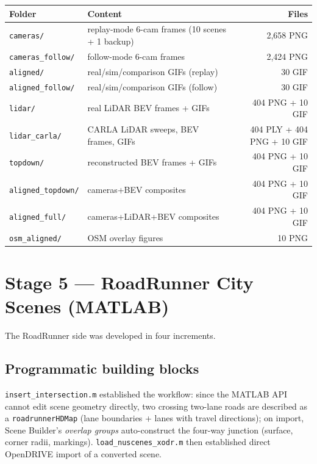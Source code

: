 \documentclass[11pt]{article}
\newcommand{\code}[1]{{\setlength{\fboxsep}{1.5pt}\colorbox{codegray}{\small\texttt{#1}}}}
\newcommand{\file}[1]{\texttt{#1}}
\begin{document}
\begin{center}
\small
\setlength{\tabcolsep}{4pt}
\begin{tabular}{@{}llr@{}}
\toprule
\textbf{Folder} & \textbf{Content} & \textbf{Files} \\
\midrule
\file{cameras/}          & replay-mode 6-cam frames (10 scenes + 1 backup) & 2{,}658 PNG \\
\file{cameras\_follow/}  & follow-mode 6-cam frames                        & 2{,}424 PNG \\
\file{aligned/}          & real/sim/comparison GIFs (replay)               & 30 GIF \\
\file{aligned\_follow/}  & real/sim/comparison GIFs (follow)               & 30 GIF \\
\file{lidar/}            & real LiDAR BEV frames + GIFs                    & 404 PNG + 10 GIF \\
\file{lidar\_carla/}     & CARLA LiDAR sweeps, BEV frames, GIFs            & 404 PLY + 404 PNG + 10 GIF \\
\file{topdown/}          & reconstructed BEV frames + GIFs                 & 404 PNG + 10 GIF \\
\file{aligned\_topdown/} & cameras+BEV composites                          & 404 PNG + 10 GIF \\
\file{aligned\_full/}    & cameras+LiDAR+BEV composites                    & 404 PNG + 10 GIF \\
\file{osm\_aligned/}     & OSM overlay figures                             & 10 PNG \\
\bottomrule
\end{tabular}
\end{center}

\section{Stage 5 --- RoadRunner City Scenes (MATLAB)}
\label{sec:rrscene}

The RoadRunner side was developed in four increments.

\subsection{Programmatic building blocks}
\file{insert\_intersection.m} established the workflow: since the MATLAB API cannot edit
scene geometry directly, two crossing two-lane roads are described as a
\code{roadrunnerHDMap} (lane boundaries + lanes with travel directions); on import,
Scene Builder's \emph{overlap groups} auto-construct the four-way junction (surface,
corner radii, markings). \file{load\_nuscenes\_xodr.m} then established direct OpenDRIVE
import of a converted scene.
\end{document}
